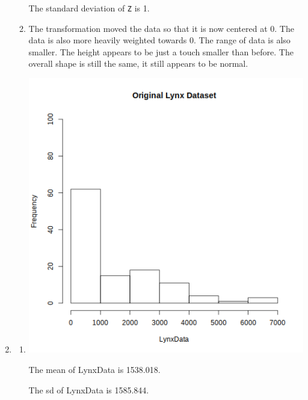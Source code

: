 \documentclass[12pt,letterpaper]{article}
\begin{document}
\begin{enumerate}
\begin{enumerate}
          The standard deviation of \texttt{Z} is 1.
        \item
          The transformation moved the data so that it is now centered at 0.
          The data is also more heavily weighted towards 0.
          The range of data is also smaller.
          The height appears to be just a touch smaller than before.
          The overall shape is still the same,
          it still appears to be normal.
      \end{enumerate}
    \item
      \begin{enumerate}
        \item
          \includegraphics[width=\linewidth]{prob2a.png}

          The mean of LynxData is \num{1538.018}.

          The sd of LynxData is \num{1585.844}.


\end{enumerate}
\end{enumerate}
\end{document}
